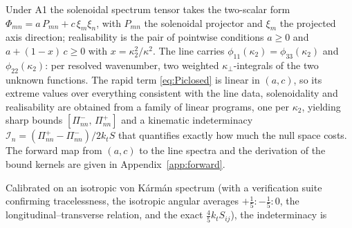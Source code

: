 \documentclass[lineno]{JFM-FLM_Au}
\begin{document}
Under A1 the solenoidal spectrum tensor takes the two-scalar form
$\Phi_{mn}=a\,P_{mn}+c\,\xi_m\xi_n$, with $P_{mn}$ the solenoidal projector
and $\xi_m$ the projected axis direction; realisability is the pair of
pointwise conditions $a\ge0$ and $a+(1-x)\,c\ge0$ with
$x=\kappa_2^2/\kappa^2$. The line carries $\phi_{11}(\kappa_2)
=\phi_{33}(\kappa_2)$ and $\phi_{22}(\kappa_2)$: per resolved wavenumber,
two weighted $\kappa_\perp$-integrals of the two unknown functions. The
rapid term \eqref{eq:Piclosed} is linear in $(a,c)$, so its extreme values
over everything consistent with the line data, solenoidality and
realisability are obtained from a family of linear programs, one per
$\kappa_2$, yielding sharp bounds
$[\Pi^{-}_{nn},\,\Pi^{+}_{nn}]$ and a kinematic indeterminacy
$\mathcal I_n=(\Pi^{+}_{nn}-\Pi^{-}_{nn})/2k_tS$ that quantifies exactly
how much the null space costs. The forward map from $(a,c)$ to the line
spectra and the derivation of the bound kernels are given in
Appendix~\ref{app:forward}.

Calibrated on an isotropic von K\'arm\'an spectrum (with a verification
suite confirming tracelessness, the isotropic angular averages
$+\tfrac15:-\tfrac15:0$, the longitudinal--transverse relation, and the
exact $\tfrac45 k_t S_{ij}$), the indeterminacy is
\end{document}
